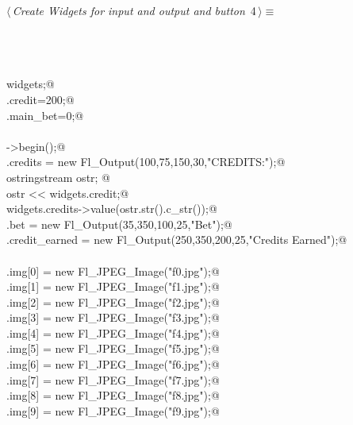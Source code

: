 \documentclass{article}
\renewcommand{\NWtarget}[2]{\hypertarget{#1}{#2}}
\begin{document}
\begin{flushleft} \small
\begin{minipage}{\linewidth}\label{scrap4}\raggedright\small
\NWtarget{nuweb4}{} $\langle\,${\it Create Widgets for input and output and button}\nobreak\ {\footnotesize {4}}$\,\rangle\equiv$
\vspace{-1ex}
\begin{list}{}{} \item
\mbox{}\verb@@\\
\mbox{}\verb@@\\
\mbox{}\verb@@\\
\mbox{}\verb@Widgets widgets;@\\
\mbox{}\verb@widgets.credit=200;@\\
\mbox{}\verb@widgets.main_bet=0;@\\
\mbox{}\verb@@\\
\mbox{}\verb@w->begin();@\\
\mbox{}\verb@widgets.credits = new Fl_Output(100,75,150,30,"CREDITS:");@\\
\mbox{}\verb@        ostringstream ostr;          @\\
\mbox{}\verb@        ostr << widgets.credit;@\\
\mbox{}\verb@        widgets.credits->value(ostr.str().c_str());@\\
\mbox{}\verb@widgets.bet = new Fl_Output(35,350,100,25,"Bet");@\\
\mbox{}\verb@widgets.credit_earned = new Fl_Output(250,350,200,25,"Credits Earned");@\\
\mbox{}\verb@@\\
\mbox{}\verb@widgets.img[0] = new Fl_JPEG_Image("f0.jpg");@\\
\mbox{}\verb@widgets.img[1] = new Fl_JPEG_Image("f1.jpg");@\\
\mbox{}\verb@widgets.img[2] = new Fl_JPEG_Image("f2.jpg");@\\
\mbox{}\verb@widgets.img[3] = new Fl_JPEG_Image("f3.jpg");@\\
\mbox{}\verb@widgets.img[4] = new Fl_JPEG_Image("f4.jpg");@\\
\mbox{}\verb@widgets.img[5] = new Fl_JPEG_Image("f5.jpg");@\\
\mbox{}\verb@widgets.img[6] = new Fl_JPEG_Image("f6.jpg");@\\
\mbox{}\verb@widgets.img[7] = new Fl_JPEG_Image("f7.jpg");@\\
\mbox{}\verb@widgets.img[8] = new Fl_JPEG_Image("f8.jpg");@\\
\mbox{}\verb@widgets.img[9] = new Fl_JPEG_Image("f9.jpg");@\\

\end{list}
\end{minipage}
\end{flushleft}
\end{document}
